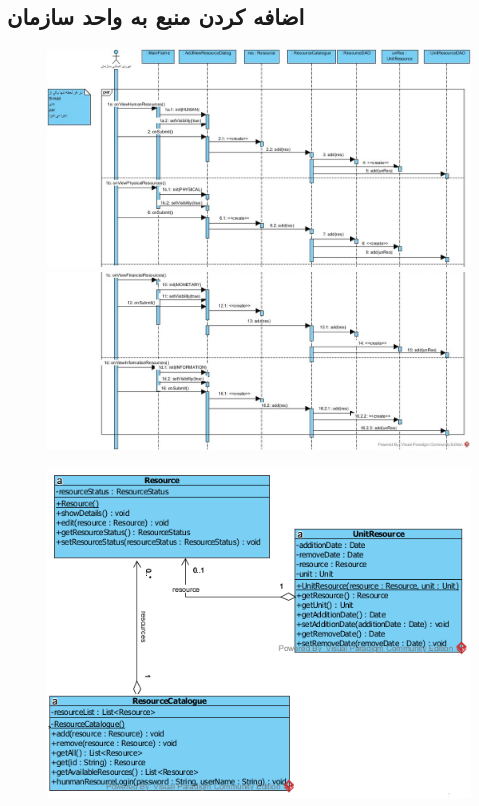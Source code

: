 \begin{landscape}
\section{اضافه کردن منبع به واحد سازمان}
\begin{figure}[H]
	\centering
	\includegraphics[scale=0.5]{img/sequence-design/AddResourceToUnit-1}
	\includegraphics[scale=0.5]{img/sequence-design/AddResourceToUnit-2}
\end{figure}
\begin{figure}[H]
	\centering
	\includegraphics[scale=0.9]{img/sequence-design/AddResourceToUnitC}

\end{figure}
\end{landscape}
